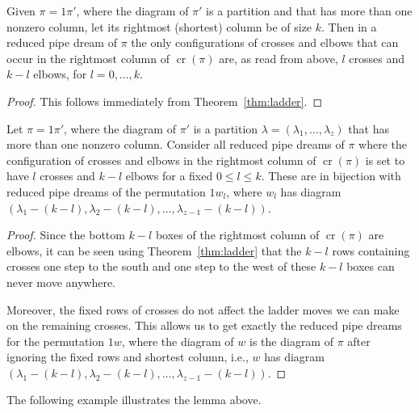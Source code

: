 \documentclass[ALCO,ThmDefs]{cedram}
\numberwithin{equation}{section}
\DeclareMathOperator{\rmcr}{cr}
\newcommand*\+{\smash{\lower2pt\hbox{\rlap{\vrule height14pt}}\raise2pt\hbox{\rlap{\hskip-3pt \vrule height.4pt depth0pt width14.7pt}}}}
\begin{document}
\begin{lemm}\label{lem:lastcol}
Given $\pi=1\pi'$, where the diagram of $\pi'$ is a partition and that has more than one nonzero column, let its rightmost (shortest) column be of size $k$. Then in a reduced pipe dream of $\pi$ the only configurations of crosses and elbows that can occur in the rightmost column of $\rmcr(\pi)$ are, as read from above, $l$ crosses and $k-l$ elbows, for $l=0,\dots,k$.
\end{lemm}

\begin{proof}
This follows immediately from Theorem~\ref{thm:ladder}.
\end{proof}

\begin{lemm}\label{lem:gen}
Let $\pi=1\pi'$, where the diagram of $\pi'$ is a partition $\lambda=(\lambda_1,\dots, \lambda_z)$ that has more than one nonzero column. Consider all reduced pipe dreams of $\pi$ where the configuration of crosses and elbows in the rightmost column of $\rmcr(\pi)$ is set to have $l$ crosses and $k-l$ elbows for a fixed $0\leq l\leq k$. These are in bijection with reduced pipe dreams of the permutation $1w_l$, where $w_l$ has diagram $(\lambda_1-(k-l), \lambda_2-(k-l), \dots, \lambda_{z-1}-(k-l))$.
\end{lemm}

\begin{proof}
Since the bottom $k-l$ boxes of the rightmost column of $\rmcr(\pi)$ are elbows, it can be seen using Theorem~\ref{thm:ladder} that the $k-l$ rows containing crosses one step to the south and one step to the west of these $k-l$ boxes can never move anywhere.

Moreover, the fixed rows of crosses do not affect the ladder moves we can make on the remaining crosses. This allows us to get exactly the reduced pipe dreams for the permutation $1w$, where the diagram of $w$ is the diagram of $\pi$ after ignoring the fixed rows and shortest column, i.e., $w$ has diagram $(\lambda_1-(k-l), \lambda_2-(k-l), \dots, \lambda_{z-1}-(k-l))$.
\end{proof}

The following example illustrates the lemma above.
\end{document}
